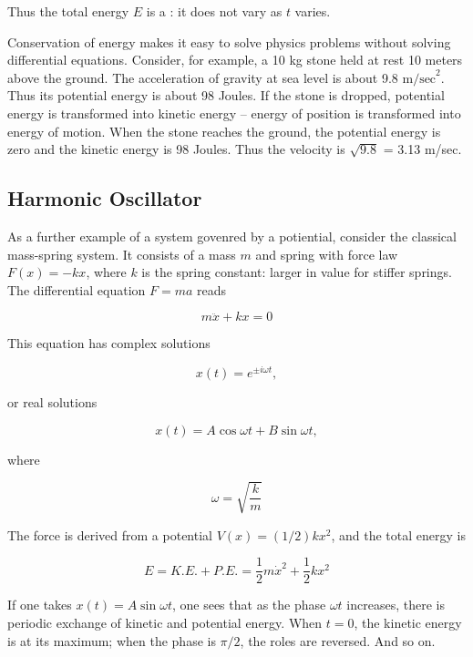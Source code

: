 Thus the total energy $E$ is a : it does not vary 
as $t$ varies.

Conservation of energy makes it easy to solve physics problems without solving differential equations.  Consider, for example, a 10 kg stone held at rest 10 meters above the ground.  The acceleration of gravity at sea level is about 9.8 $\text{m/sec}^2$.  Thus its potential energy is about 98 Joules.  If the stone is dropped, potential energy is transformed into kinetic energy -- energy of position is transformed into energy of motion. When the stone reaches the ground, the potential energy is zero and the kinetic energy is 98 Joules.  Thus the velocity is $\sqrt{9.8}$ = 3.13 m/sec.  

\subsection{Harmonic Oscillator}

As a further example of a system govenred by a potiential, consider the classical mass-spring system.  It consists of a mass $m$ and spring with force law $F(x) = - kx$, where $k$ is the spring constant: larger in value for stiffer springs.  The differential equation $F = ma$ reads

\begin{equation}
m\ddot x + kx = 0
\end{equation}

This equation has complex solutions 

\begin{equation}
  x(t) = e^{\pm i\omega t},
\end{equation}

or real solutions

\begin{equation}
  x(t) = A\cos \omega t + B \sin \omega t,
\end{equation}

where 

\begin{equation}
\omega = \sqrt{\frac{k}{m}}
\end{equation}

The force is derived from a potential $V(x) = (1/2)kx^2$, and the total energy is

\begin{equation}
E = K.E. + P.E. = \frac{1}{2}m\dot x^2 + \frac{1}{2}kx^2
\end{equation}

If one takes $x(t) = A\sin \omega t$, one sees that as the phase $\omega t$ increases, there is periodic exchange of kinetic and potential energy.  When $t = 0$, the kinetic energy is at its maximum; when the phase is $\pi/2$, the roles are reversed.  And so on.


